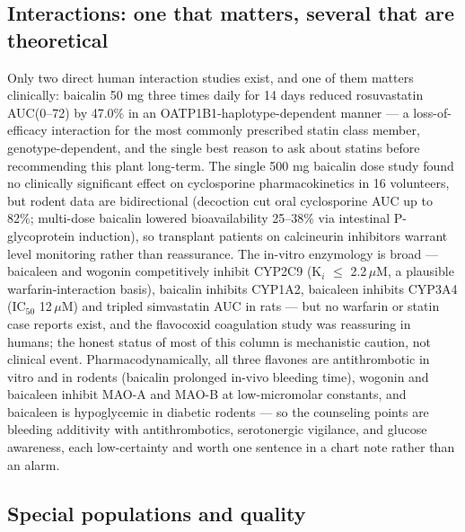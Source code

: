 \subsection{Interactions: one that matters, several that are theoretical}

Only two direct human interaction studies exist, and one of them matters clinically: baicalin 50 mg three times daily for 14 days reduced rosuvastatin AUC(0--72) by 47.0\% in an OATP1B1-haplotype-dependent manner --- a loss-of-efficacy interaction for the most commonly prescribed statin class member, genotype-dependent, and the single best reason to ask about statins before recommending this plant long-term. The single 500 mg baicalin dose study found no clinically significant effect on cyclosporine pharmacokinetics in 16 volunteers, but rodent data are bidirectional (decoction cut oral cyclosporine AUC up to 82\%; multi-dose baicalin lowered bioavailability 25--38\% via intestinal P-glycoprotein induction), so transplant patients on calcineurin inhibitors warrant level monitoring rather than reassurance. The in-vitro enzymology is broad --- baicaleen and wogonin competitively inhibit CYP2C9 (K$_i$ $\leq$ 2.2\,$\mu$M, a plausible warfarin-interaction basis), baicalin inhibits CYP1A2, baicaleen inhibits CYP3A4 (IC$_{50}$ 12\,$\mu$M) and tripled simvastatin AUC in rats --- but no warfarin or statin case reports exist, and the flavocoxid coagulation study was reassuring in humans; the honest status of most of this column is mechanistic caution, not clinical event. Pharmacodynamically, all three flavones are antithrombotic in vitro and in rodents (baicalin prolonged in-vivo bleeding time), wogonin and baicaleen inhibit MAO-A and MAO-B at low-micromolar constants, and baicaleen is hypoglycemic in diabetic rodents --- so the counseling points are bleeding additivity with antithrombotics, serotonergic vigilance, and glucose awareness, each low-certainty and worth one sentence in a chart note rather than an alarm.

\subsection{Special populations and quality}

